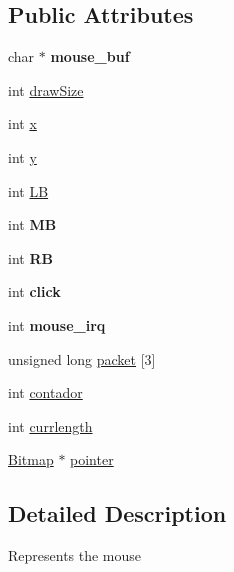 \subsection*{Public Attributes}
\begin{DoxyCompactItemize}
\item 
char $\ast$ {\bfseries mouse\+\_\+buf}\hypertarget{structMouse_a4e2cdc6360a1a6f44c488984f701e3c1}{}\label{structMouse_a4e2cdc6360a1a6f44c488984f701e3c1}

\item 
int \hyperlink{structMouse_a2f336c5b976d203e94cfd39cdb605bd4}{draw\+Size}
\item 
int \hyperlink{structMouse_a136eea114b70f46392b89cc3779d4291}{x}
\item 
int \hyperlink{structMouse_a4a29b1c18faaa2fbe39ff985ba9d6737}{y}
\item 
int \hyperlink{structMouse_a6ffdaafd5ac181e36e9ad74dc3c188eb}{LB}
\item 
int {\bfseries MB}\hypertarget{structMouse_a6cfe8944be29ae37eff39729e6436d64}{}\label{structMouse_a6cfe8944be29ae37eff39729e6436d64}

\item 
int {\bfseries RB}\hypertarget{structMouse_afcc1ce6eeeb2d0fdb1664868ddb8330f}{}\label{structMouse_afcc1ce6eeeb2d0fdb1664868ddb8330f}

\item 
int {\bfseries click}\hypertarget{structMouse_ab94f98917e206163310ad54883f2bae2}{}\label{structMouse_ab94f98917e206163310ad54883f2bae2}

\item 
int {\bfseries mouse\+\_\+irq}\hypertarget{structMouse_aa0b20b3b71144384f4c8f2dc5e4c17db}{}\label{structMouse_aa0b20b3b71144384f4c8f2dc5e4c17db}

\item 
unsigned long \hyperlink{structMouse_a8bfb0c35eb14423f5086a355d52dc733}{packet} \mbox{[}3\mbox{]}
\item 
int \hyperlink{structMouse_a8dc967db73702ddb693145652f10071b}{contador}
\item 
int \hyperlink{structMouse_a5db413bdb085f7618c43c4740d8058dd}{currlength}
\item 
\hyperlink{structBitmap}{Bitmap} $\ast$ \hyperlink{structMouse_ab0790e9d4a70b93662c60313b61ce9b7}{pointer}
\end{DoxyCompactItemize}


\subsection{Detailed Description}
Represents the mouse 

